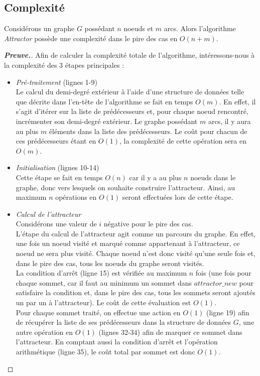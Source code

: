 \documentclass[12pt,a4paper,oneside,titlepage]{report}
\newenvironment{demonstration}{\begin{proof}[\textnormal{\textbf{Preuve.}}]}{\end{proof}}
\begin{document}
\subsection{Complexité}
Considérons un graphe $G$ possédant $n$ noeuds et $m$ arcs. Alors l'algorithme \emph{Attractor} possède une complexité dans le pire des cas en $O(n+m)$.
\begin{demonstration}
Afin de calculer la complexité totale de l'algorithme, intéressons-nous à la complexité des 3 étapes principales :
\begin{itemize}
\item \textit{Pré-traitement} (lignes 1-9)\\
Le calcul du demi-degré extérieur à l'aide d'une structure de données telle que décrite dans l'en-tête de l'algorithme se fait en temps $O(m)$. En effet, il s'agit d'itérer sur la liste de prédécesseurs et, pour chaque noeud rencontré, incrémenter son demi-degré extérieur. Le graphe possédant $m$ arcs, il y aura au plus $m$ éléments dans la liste des prédécesseurs. Le coût pour chacun de ces prédécesseurs étant en $O(1)$, la complexité de cette opération sera en $O(m)$.
\item \textit{Initialisation} (lignes 10-14)\\
Cette étape se fait en temps $O(n)$ car il y a au plus $n$ noeuds dans le graphe, donc vers lesquels on souhaite construire l'attracteur. Ainsi, au maximum $n$ opérations en $O(1)$ seront effectuées lors de cette étape.
\item \textit{Calcul de l'attracteur}\\
Considérons une valeur de $i$ négative pour le pire des cas.\\
L'étape du calcul de l'attracteur agit comme un parcours du graphe. En effet, une fois un noeud visité et marqué comme appartenant à l'attracteur, ce noeud ne sera plus visité. Chaque noeud n'est donc visité qu'une seule fois et, dans le pire des cas, tous les noeuds du graphe seront visités.\\
La condition d'arrêt (ligne 15) est vérifiée au maximum $n$ fois (une fois pour chaque sommet, car il faut au minimum un sommet dans $attractor\_new$ pour satisfaire la condition et, dans le pire des cas, tous les sommets seront ajoutés un par un à l'attracteur). Le coût de cette évaluation est $O(1)$.\\
Pour chaque sommet traité, on effectue une action en $O(1)$ (ligne 19) afin de récupérer la liste de ses prédécesseurs dans la structure de données $G$, une autre opération en $O(1)$ (lignes 32-34) afin de marquer ce sommet dans l'attracteur. En comptant aussi la condition d'arrêt et l'opération arithmétique (ligne 35), le coût total par sommet est donc $O(1)$.\\

\end{itemize}
\end{demonstration}
\end{document}
